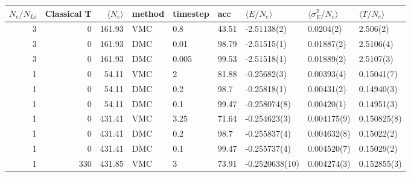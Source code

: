 \begin{tabular}{rrrllllll}
\toprule
 $N_e/N_{Li}$ &  Classical T &  $\langle N_e\rangle$ & method & timestep &    acc & $\langle E/N_e \rangle$ & $\langle\sigma_E^2/ N_e\rangle$ & $\langle T/N_e \rangle$ \\
\midrule
            3 &            0 &                161.93 &    VMC &      0.8 &  43.51 &                           -2.51138(2) &                       0.0204(2) &                              2.506(2) \\
            3 &            0 &                161.93 &    DMC &     0.01 &  98.79 &                           -2.51515(1) &                      0.01887(2) &                             2.5106(4) \\
            3 &            0 &                161.93 &    DMC &    0.005 &  99.53 &                           -2.51518(1) &                      0.01889(2) &                             2.5107(3) \\
            1 &            0 &                 54.11 &    VMC &        2 &  81.88 &                           -0.25682(3) &                      0.00393(4) &                            0.15041(7) \\
            1 &            0 &                 54.11 &    DMC &      0.2 &   98.7 &                           -0.25818(1) &                      0.00431(2) &                            0.14940(3) \\
            1 &            0 &                 54.11 &    DMC &      0.1 &  99.47 &                          -0.258074(8) &                      0.00420(1) &                            0.14951(3) \\
            1 &            0 &                431.41 &    VMC &     3.25 &  71.64 &                          -0.254623(3) &                     0.004175(9) &                           0.150825(8) \\
            1 &            0 &                431.41 &    DMC &      0.2 &   98.7 &                          -0.255837(4) &                     0.004632(8) &                            0.15022(2) \\
            1 &            0 &                431.41 &    DMC &      0.1 &  99.47 &                          -0.255737(4) &                     0.004520(7) &                            0.15029(2) \\
            1 &          330 &                431.85 &    VMC &        3 &  73.91 &                        -0.2520638(10) &                     0.004274(3) &                           0.152855(3) \\

\end{tabular}
